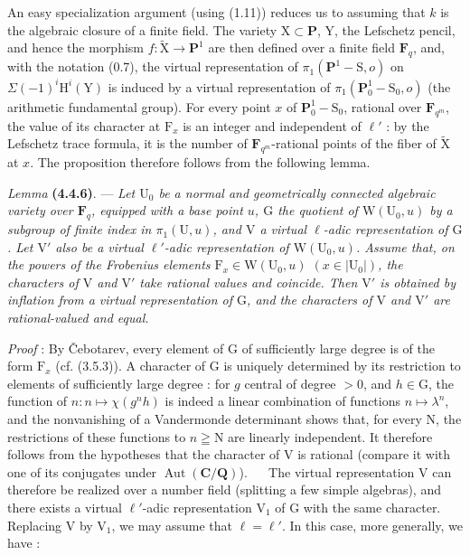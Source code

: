 \documentclass[11pt,leqno]{article}
\newcommand{\Page}[1]{\ifvmode\noindent\else\unskip\ \fi{\footnotesize\textcolor{gray}{[p.\,#1]}}\ \ignorespaces}
\begin{document}
An easy specialization argument (using (1.11)) reduces us to assuming that \(k\) is the algebraic closure of a finite field. The variety \(\mathrm{X}\subset\mathbf{P}\), \(\mathrm{Y}\), the Lefschetz pencil, and hence the morphism \(f:\widetilde{\mathrm{X}}\to\mathbf{P}^1\) are then defined over a finite field \(\mathbf{F}_q\), and, with the notation (0.7), the virtual representation of \(\pi_1(\mathbf{P}^1-\mathrm{S},o)\) on \(\Sigma(-1)^i\mathrm{H}^i(\mathrm{Y})\) is induced by a virtual representation of \(\pi_1(\mathbf{P}^1_0-\mathrm{S}_0,o)\) (the arithmetic fundamental group). For every point \(x\) of \(\mathbf{P}^1_0-\mathrm{S}_0\), rational over \(\mathbf{F}_{q^m}\), the value of its character at \(\mathrm{F}_x\) is an integer and independent of \(\ell'\) : by the Lefschetz trace formula, it is the number of \(\mathbf{F}_{q^m}\)-rational points of the fiber of \(\widetilde{\mathrm{X}}\) at \(x\). The proposition therefore follows from the following lemma.

\textit{Lemma} \textbf{(4.4.6)}. — \textit{Let \(\mathrm{U}_0\) be a normal and geometrically connected algebraic variety over \(\mathbf{F}_q\), equipped with a base point \(u\), \(\mathrm{G}\) the quotient of \(\mathrm{W}(\mathrm{U}_0,u)\) by a subgroup of finite index in \(\pi_1(\mathrm{U},u)\), and \(\mathrm{V}\) a virtual \(\ell\)-adic representation of \(\mathrm{G}\). Let \(\mathrm{V}'\) also be a virtual \(\ell'\)-adic representation of \(\mathrm{W}(\mathrm{U}_0,u)\). Assume that, on the powers of the Frobenius elements \(\mathrm{F}_x\in\mathrm{W}(\mathrm{U}_0,u)\) \((x\in|\mathrm{U}_0|)\), the characters of \(\mathrm{V}\) and \(\mathrm{V}'\) take rational values and coincide. Then \(\mathrm{V}'\) is obtained by inflation from a virtual representation of \(\mathrm{G}\), and the characters of \(\mathrm{V}\) and \(\mathrm{V}'\) are rational-valued and equal.}

\textit{Proof} : By \v{C}ebotarev, every element of \(\mathrm{G}\) of sufficiently large degree is of the form \(\mathrm{F}_x\) (cf. (3.5.3)). A character of \(\mathrm{G}\) is uniquely determined by its restriction to elements of sufficiently large degree : for \(g\) central of degree \(>0\), and \(h\in\mathrm{G}\), the function of \(n:n\mapsto\chi(g^nh)\) is indeed a linear combination of functions \(n\mapsto\lambda^n\), and the nonvanishing of a Vandermonde determinant shows that, for every \(\mathrm{N}\), the restrictions of these functions to \(n\geqq\mathrm{N}\) are linearly independent. It therefore follows from the hypotheses that the character of \(\mathrm{V}\) is rational (compare it with one of its conjugates under \(\operatorname{Aut}(\mathbf{C}/\mathbf{Q})\)).
\Page{230}
The virtual representation \(\mathrm{V}\) can therefore be realized over a number field (splitting a few simple algebras), and there exists a virtual \(\ell'\)-adic representation \(\mathrm{V}_1\) of \(\mathrm{G}\) with the same character. Replacing \(\mathrm{V}\) by \(\mathrm{V}_1\), we may assume that \(\ell=\ell'\). In this case, more generally, we have :
\end{document}
